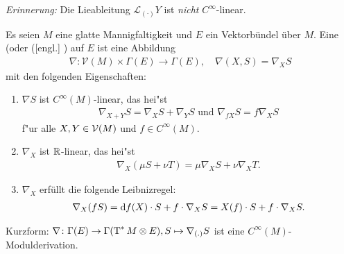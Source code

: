 \emph{Erinnerung:} Die Lieableitung $\mathcal L_{(\cdot)}Y$ ist \emph{nicht} $C^{\infty}$-linear.

\begin{Dfn}
  Es seien $M$ eine glatte Mannigfaltigkeit und $E$ ein Vektorbündel über $M$.
  Eine  (oder  ([engl.] ) auf $E$ ist eine Abbildung
  \begin{align*}
    \nabla \colon \mathcal V(M) \times \Gamma(E) \to \Gamma(E), \quad \nabla(X,S) = \nabla_XS
  \end{align*}
  mit den folgenden Eigenschaften:
  \begin{enumerate}[label=(\roman*),widest=iii]
  \item $\nabla S$ ist $C^{\infty}(M)$-linear, das hei"st
    \begin{align*}
      \nabla_{X+Y}S = \nabla_XS+\nabla_YS \text{ und } \nabla_{fX}S = f\nabla_XS
    \end{align*}
    f"ur alle $X, Y \in \operatorname{\mathcal{V}}(M)$ und $f \in C^{\infty}(M)$.
  \item $\nabla_X$ ist $\operatorname{\mathbb{R}}$-linear, das hei"st
    \begin{align*}
      \nabla_X(\mu S + \nu T) = \mu\nabla_XS + \nu\nabla_XT.
    \end{align*}
  \item $\nabla_X$ erfüllt die folgende Leibnizregel:
    \begin{align*}
      \nabla_X(fS) = \mathrm{d} f(X) \cdot S + f\cdot \nabla_XS = X(f)\cdot S + f \cdot \nabla_XS.
    \end{align*}
  \end{enumerate}
  Kurzform: $\nabla \colon \Gamma(E) \to \Gamma(\operatorname{T}^{*}M \otimes E), S \mapsto \nabla_{(.)}S$ ist eine $C^{\infty}(M)$-Modulderivation.
\end{Dfn}

